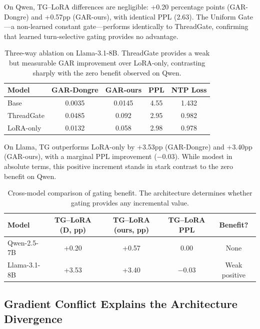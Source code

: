 \documentclass[11pt,a4paper]{article}
\begin{document}
On Qwen, TG--LoRA differences are negligible: +0.20 percentage points (GAR-Dongre) and +0.57pp (GAR-ours), with identical PPL (2.63).
The Uniform Gate---a non-learned constant gate---performs identically to ThreadGate, confirming that learned turn-selective gating provides no advantage.

\begin{table}[h]
\centering
\small
\caption{Three-way ablation on Llama-3.1-8B. ThreadGate provides a weak but measurable GAR improvement over LoRA-only, contrasting sharply with the zero benefit observed on Qwen.}
\label{tab:llama_ablation}
\begin{tabular}{lcccc}
\toprule
\textbf{Model} & \textbf{GAR-Dongre} & \textbf{GAR-ours} & \textbf{PPL} & \textbf{NTP Loss} \\
\midrule
Base & 0.0035 & 0.0145 & 4.55 & 1.432 \\
ThreadGate & 0.0485 & 0.092 & 2.95 & 0.982 \\
LoRA-only & 0.0132 & 0.058 & 2.98 & 0.978 \\
\bottomrule
\end{tabular}
\end{table}

On Llama, TG outperforms LoRA-only by +3.53pp (GAR-Dongre) and +3.40pp (GAR-ours), with a marginal PPL improvement ($-0.03$).
While modest in absolute terms, this positive increment stands in stark contrast to the zero benefit on Qwen.

\begin{table}[h]
\centering
\small
\caption{Cross-model comparison of gating benefit. The architecture determines whether gating provides any incremental value.}
\label{tab:cross_model_benefit}
\begin{tabular}{lcccc}
\toprule
\textbf{Model} & \textbf{TG--LoRA (D, pp)} & \textbf{TG--LoRA (ours, pp)} & \textbf{TG--LoRA PPL} & \textbf{Benefit?} \\
\midrule
Qwen-2.5-7B & +0.20 & +0.57 & 0.00 & None \\
Llama-3.1-8B & +3.53 & +3.40 & $-0.03$ & Weak positive \\
\bottomrule
\end{tabular}
\end{table}

\subsection{Gradient Conflict Explains the Architecture Divergence}
\label{sec:gradient}
\end{document}
